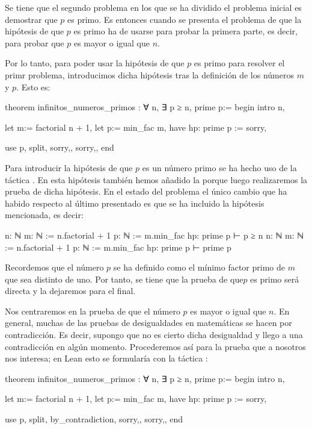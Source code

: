 Se tiene que el segundo problema en los que se ha dividido el problema inicial
es demostrar que \(p\) es primo. Es entonces cuando se presenta el problema de
que la hipótesis de que \(p\) es primo ha de usarse para probar la primera
parte, es decir, para probar que \(p\) es mayor o igual que \(n\).

Por lo tanto, para poder usar la hipótesis de que \(p\) es primo para resolver
el primr problema, introducimos dicha hipótesis tras la definición de los
números \(m\) y \(p\). Esto es:
\begin{leancode}
theorem infinitos_numeros_primos : ∀ n, ∃ p ≥ n, prime p:=
begin
  intro n,

  let m:= factorial n + 1,
  let p:= min_fac m,
  have hp: prime p := sorry,

  use p,
  split,
  {sorry,},
  {sorry,},
end
\end{leancode}

Para introducir la hipótesis de que \(p\) es un número primo se ha hecho
uso de la táctica . En esta hipótesis también hemos añadido
la  porque luego realizaremos la prueba de dicha
hipótesis. En el estado del problema el único cambio que ha habido respecto al
último presentado es que se ha incluido la hipótesis mencionada, es decir:
\begin{leancode}
n: ℕ
m: ℕ := n.factorial + 1
p: ℕ := m.min_fac
hp: prime p
⊢ p ≥ n
n: ℕ
m: ℕ := n.factorial + 1
p: ℕ := m.min_fac
hp: prime p
⊢ prime p
\end{leancode}

Recordemos que el número \(p\) se ha definido como el mínimo factor primo de
\(m\) que sea distinto de uno. Por tanto, se tiene que la prueba de que\(p\)
es primo será directa y la dejaremos para el final.

Nos centraremos en la prueba de que el número \(p\) es mayor o igual que \(n\).
En general, muchas de las pruebas de desigualdades en matemáticas se hacen
por contradicción. Es decir, supongo que no es cierto dicha desigualdad y
llego a una contradicción en algún momento. Procederemos así para la prueba
que a nosotros nos interesa; en Lean esto se formularía con la táctica
:
\begin{leancode}
theorem infinitos_numeros_primos : ∀ n, ∃ p ≥ n, prime p:=
begin
  intro n,

  let m:= factorial n + 1,
  let p:= min_fac m,
  have hp: prime p := sorry,

  use p,
  split,
  {by_contradiction,
  sorry,},
  {sorry,},
end
\end{leancode}

